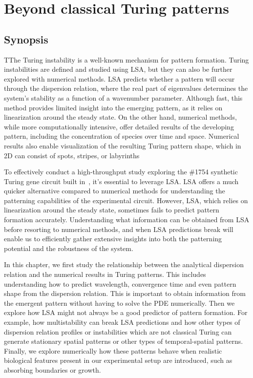 \chapter{Beyond classical Turing patterns}\label{Chapter 1}
\section{Synopsis}
TThe Turing instability is a well-known mechanism for pattern formation. Turing instabilities are defined and studied using \acrfull{LSA}, but they can also be further explored with numerical methods. LSA predicts whether a pattern will occur through the dispersion relation, where the real part of eigenvalues determines the system's stability as a function of a wavenumber parameter. Although fast, this method provides limited insight into the emerging pattern, as it relies on linearization around the steady state. On the other hand, numerical methods, while more computationally intensive, offer detailed results of the developing pattern, including the concentration of species over time and space. Numerical results also enable visualization of the resulting Turing pattern shape, which in 2D can consist of spots, stripes, or labyrinths

To effectively conduct a high-throughput study exploring the \#1754 synthetic Turing gene circuit built in~\cite{Tica2020}, it's essential to leverage LSA.
LSA offers a much quicker alternative compared to numerical methods for understanding the patterning capabilities of the experimental circuit.
However, LSA, which relies on linearization around the steady state, sometimes fails to predict pattern formation accurately.
Understanding what information can be obtained from LSA before resorting to numerical methods, and when LSA predictions break will enable us to efficiently gather extensive insights into both the patterning potential and the robustness of the system.

In this chapter, we first study the relationship between the analytical dispersion relation and the numerical results in Turing patterns.
This includes understanding how to predict wavelength,
convergence time and even pattern shape from the dispersion relation.
This is important to obtain information from the emergent pattern without having to solve the \acrfull{PDE} numerically.
Then we explore how LSA might not always be a good predictor of pattern formation.
For example, how multistability can break LSA predictions and how other types of dispersion relation profiles or instabilities which are not classical Turing can generate stationary spatial patterns or other types of temporal-spatial patterns.
Finally, we explore numerically how these patterns behave when realistic biological features present in our experimental setup are introduced, such as absorbing boundaries or growth.



